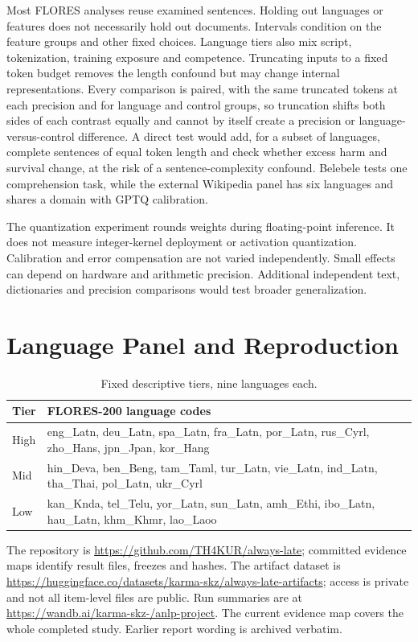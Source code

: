 \documentclass[11pt]{article}
\begin{document}
Most FLORES analyses reuse examined sentences. Holding out languages or features does not necessarily hold out documents. Intervals condition on the feature groups and other fixed choices. Language tiers also mix script, tokenization, training exposure and competence. Truncating inputs to a fixed token budget removes the length confound but may change internal representations. Every comparison is paired, with the same truncated tokens at each precision and for language and control groups, so truncation shifts both sides of each contrast equally and cannot by itself create a precision or language-versus-control difference. A direct test would add, for a subset of languages, complete sentences of equal token length and check whether excess harm and survival change, at the risk of a sentence-complexity confound. Belebele tests one comprehension task, while the external Wikipedia panel has six languages and shares a domain with GPTQ calibration.

The quantization experiment rounds weights during floating-point inference. It does not measure integer-kernel deployment or activation quantization. Calibration and error compensation are not varied independently. Small effects can depend on hardware and arithmetic precision. Additional independent text, dictionaries and precision comparisons would test broader generalization.


\clearpage
\nobalance
\appendix
\renewcommand{\dbltopfraction}{0.95}
\renewcommand{\textfraction}{0.05}
\section{Language Panel and Reproduction}
\label{app:languages}
\begin{table}[h]
\centering\small
\begin{tabular}{lp{5.3cm}}
\toprule
Tier & FLORES-200 language codes\\
\midrule
High & eng\_Latn, deu\_Latn, spa\_Latn, fra\_Latn, por\_Latn, rus\_Cyrl, zho\_Hans, jpn\_Jpan, kor\_Hang\\
Mid & hin\_Deva, ben\_Beng, tam\_Taml, tur\_Latn, vie\_Latn, ind\_Latn, tha\_Thai, pol\_Latn, ukr\_Cyrl\\
Low & kan\_Knda, tel\_Telu, yor\_Latn, sun\_Latn, amh\_Ethi, ibo\_Latn, hau\_Latn, khm\_Khmr, lao\_Laoo\\
\bottomrule
\end{tabular}
\caption{Fixed descriptive tiers, nine languages each.}
\end{table}
The repository is \url{https://github.com/TH4KUR/always-late}; committed evidence maps identify result files, freezes and hashes. The artifact dataset is \url{https://huggingface.co/datasets/karma-skz/always-late-artifacts}; access is private and not all item-level files are public. Run summaries are at \url{https://wandb.ai/karma-skz-/anlp-project}. The current evidence map covers the whole completed study. Earlier report wording is archived verbatim.
\end{document}
